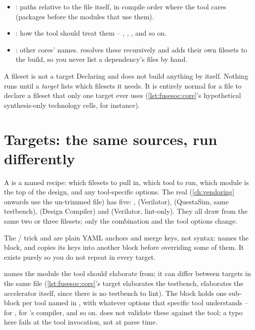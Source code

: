 \begin{itemize}
  \item {}: paths relative to the  file itself, in
        compile order where the tool cares (packages before the modules that
        use them).
  \item {}: how the tool should treat them --
        , , , and
        so on.
  \item {}: other cores' names. \FuseSoC resolves these recursively
        and adds their own filesets to the build, so you never list a
        dependency's files by hand.
\end{itemize}

\begin{gotcha}{A fileset is not a target}
Declaring  and  does not build anything by itself.
Nothing runs until a \emph{target} lists which filesets it needs. It is
entirely normal for a  file to declare a fileset that only one
target ever uses (\cref{lst:fusesoc:core}'s hypothetical synthesis-only
technology cells, for instance).
\end{gotcha}

\section{Targets: the same sources, run differently}

A  is a named recipe: which filesets to pull in, which tool to
run, which module is the top of the design, and any tool-specific options.
The real  (\cref{ch:vendoring} onwards use the
un-trimmed file) has five: ,  (Verilator),
 (QuestaSim, same testbench),  (Design
Compiler) and  (Verilator, lint-only). They all draw from the same
two or three filesets; only the combination and the tool options change.

\begin{notebox}{The  /  trick}
 and  are plain YAML anchors and merge
keys, not \FuseSoC syntax:  names the  block,
and  copies its keys into another block before
overriding some of them. It exists purely so you do not repeat
 in every target.
\end{notebox}

 names the module the tool should elaborate from; it can differ
between targets in the same file (\cref{lst:fusesoc:core}'s 
target elaborates the testbench,  elaborates the accelerator
itself, since there is no testbench to lint). The  block holds
one sub-block per tool named in , with whatever options
that specific tool understands --  for
,  for 's compiler, and
so on. \FuseSoC does not validate these against the tool; a typo here fails
at the tool invocation, not at parse time.

